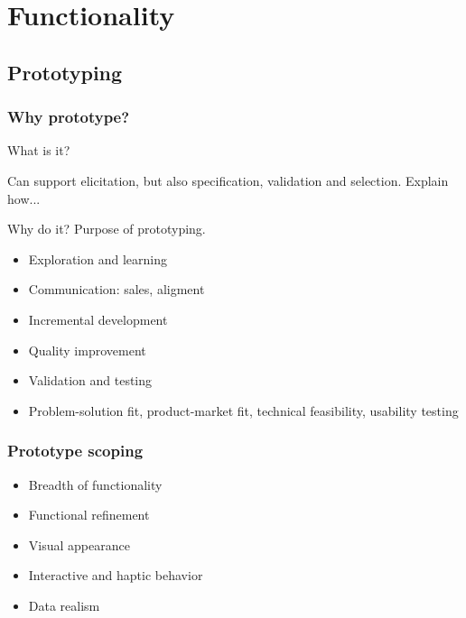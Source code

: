 \documentclass{reqengbook}
\begin{document}





\part{Functionality}  %






\chapter{Prototyping}

\section{Why prototype?}

What is it?

Can support elicitation, but also specification, validation and selection. Explain how...

Why do it? Purpose of prototyping.

\begin{itemize}
  \item Exploration and learning
  \item Communication: sales, aligment
  \item Incremental development
  \item Quality improvement
  \item Validation and testing
  \item Problem-solution fit, product-market fit, technical feasibility, usability testing
\end{itemize}

\section{Prototype scoping}

\begin{itemize}
  \item Breadth of functionality
  \item Functional refinement
  \item Visual appearance
  \item Interactive and haptic behavior
  \item Data realism
\end{itemize}
\end{document}
